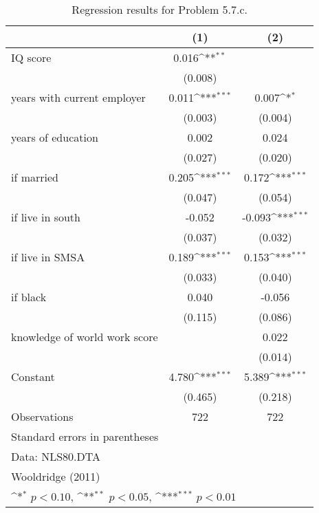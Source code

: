\begin{table}[htbp]\centering
\def\sym#1{\ifmmode^{#1}\else\(^{#1}\)\fi}
\caption{Regression results for Problem 5.7.c.}
\begin{tabular}{l*{2}{c}}
\toprule
                    &\multicolumn{1}{c}{(1)}         &\multicolumn{1}{c}{(2)}         \\
\midrule
IQ score            &       0.016\sym{**} &                     \\
                    &     (0.008)         &                     \\
\addlinespace
years with current employer&       0.011\sym{***}&       0.007\sym{*}  \\
                    &     (0.003)         &     (0.004)         \\
\addlinespace
years of education  &       0.002         &       0.024         \\
                    &     (0.027)         &     (0.020)         \\
\addlinespace
=1 if married       &       0.205\sym{***}&       0.172\sym{***}\\
                    &     (0.047)         &     (0.054)         \\
\addlinespace
=1 if live in south &      -0.052         &      -0.093\sym{***}\\
                    &     (0.037)         &     (0.032)         \\
\addlinespace
=1 if live in SMSA  &       0.189\sym{***}&       0.153\sym{***}\\
                    &     (0.033)         &     (0.040)         \\
\addlinespace
=1 if black         &       0.040         &      -0.056         \\
                    &     (0.115)         &     (0.086)         \\
\addlinespace
knowledge of world work score&                     &       0.022         \\
                    &                     &     (0.014)         \\
\addlinespace
Constant            &       4.780\sym{***}&       5.389\sym{***}\\
                    &     (0.465)         &     (0.218)         \\
\midrule
Observations        &         722         &         722         \\
\bottomrule
\multicolumn{3}{l}{\footnotesize Standard errors in parentheses}\\
\multicolumn{3}{l}{\footnotesize Data: NLS80.DTA}\\
\multicolumn{3}{l}{\footnotesize Wooldridge (2011)}\\
\multicolumn{3}{l}{\footnotesize \sym{*} \(p<0.10\), \sym{**} \(p<0.05\), \sym{***} \(p<0.01\)}\\
\end{tabular}
\end{table}
